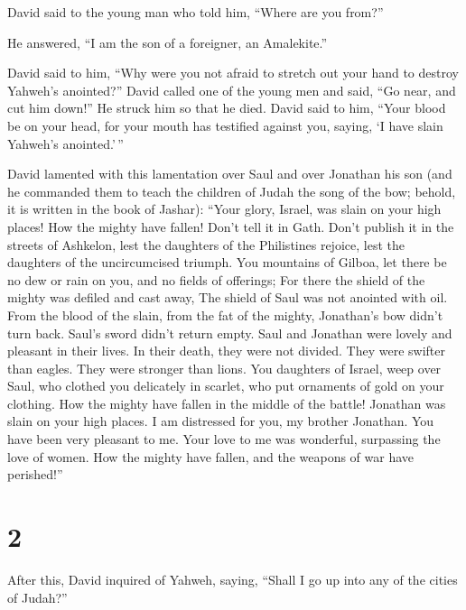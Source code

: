  David said to the young man who told him, ``Where are you
from?''

He answered, ``I am the son of a foreigner, an Amalekite.''

 David said to him, ``Why were you not afraid to stretch
out your hand to destroy Yahweh's anointed?''  David called
one of the young men and said, ``Go near, and cut him down!'' He struck
him so that he died.  David said to him, ``Your blood be on
your head, for your mouth has testified against you, saying, `I have
slain Yahweh's anointed.'\,''

 David lamented with this lamentation over Saul and over
Jonathan his son  (and he commanded them to teach the
children of Judah the song of the bow; behold, it is written in the book
of Jashar):  ``Your glory, Israel, was slain on your high
places! How the mighty have fallen!  Don't tell it in Gath.
Don't publish it in the streets of Ashkelon, lest the daughters of the
Philistines rejoice, lest the daughters of the uncircumcised triumph.
 You mountains of Gilboa, let there be no dew or rain on
you, and no fields of offerings; For there the shield of the mighty was
defiled and cast away, The shield of Saul was not anointed with oil.
 From the blood of the slain, from the fat of the mighty,
Jonathan's bow didn't turn back. Saul's sword didn't return empty.
 Saul and Jonathan were lovely and pleasant in their lives.
In their death, they were not divided. They were swifter than eagles.
They were stronger than lions.  You daughters of Israel,
weep over Saul, who clothed you delicately in scarlet, who put ornaments
of gold on your clothing.  How the mighty have fallen in
the middle of the battle! Jonathan was slain on your high places.
 I am distressed for you, my brother Jonathan. You have
been very pleasant to me. Your love to me was wonderful, surpassing the
love of women.  How the mighty have fallen, and the weapons
of war have perished!''

\hypertarget{section-1}{%
\section{2}\label{section-1}}

 After this, David inquired of Yahweh, saying, ``Shall I go
up into any of the cities of Judah?''

